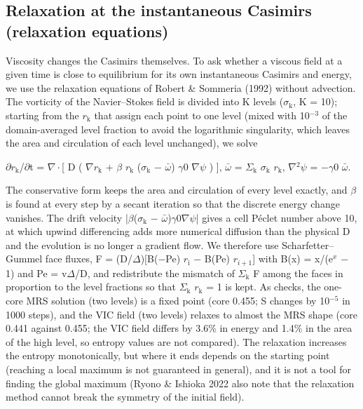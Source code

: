 \documentclass[11pt]{article}
\begin{document}
\subsection{Relaxation at the instantaneous Casimirs (relaxation equations)}
Viscosity changes the Casimirs themselves. To ask whether a viscous field at a given time is close to equilibrium for its own instantaneous Casimirs and energy, we use the relaxation equations of Robert \& Sommeria (1992) without advection. The vorticity of the Navier--Stokes field is divided into K levels ($\sigma{}_{\mathrm{k}}$, K = 10); starting from the $r_{\mathrm{k}}$ that assign each point to one level (mixed with 10$^{-3}$ of the domain-averaged level fraction to avoid the logarithmic singularity, which leaves the area and circulation of each level unchanged), we solve

  $\partial{}r_{\mathrm{k}}$/$\partial{}$t = $\nabla{}\cdot{}$[ D ( $\nabla{}r_{\mathrm{k}}$ + $\beta{}$ $r_{\mathrm{k}}$ ($\sigma{}_{\mathrm{k}}$ $-$ $\bar{\omega}$) $\gamma{}$0 $\nabla{}\psi{}$ ) ],  $\bar{\omega}$ = $\Sigma{}_{\mathrm{k}}$ $\sigma{}_{\mathrm{k}}$ $r_{\mathrm{k}}$,  $\nabla{}^{2}\psi{}$ = $-\gamma{}$0 $\bar{\omega}$.

The conservative form keeps the area and circulation of every level exactly, and $\beta{}$ is found at every step by a secant iteration so that the discrete energy change vanishes. The drift velocity |$\beta{}$($\sigma{}_{\mathrm{k}}$ $-$ $\bar{\omega}$)$\gamma{}$0$\nabla{}\psi{}$| gives a cell P\'eclet number above 10, at which upwind differencing adds more numerical diffusion than the physical D and the evolution is no longer a gradient flow. We therefore use Scharfetter--Gummel face fluxes, F = (D/$\Delta{}$)[B($-$Pe) $r_{\mathrm{i}}$ $-$ B(Pe) $r_{i+1}$] with B(x) = x/(e$^{x}$ $-$ 1) and Pe = v$\Delta{}$/D, and redistribute the mismatch of $\Sigma{}_{\mathrm{k}}$ F among the faces in proportion to the level fractions so that $\Sigma{}_{\mathrm{k}}$ $r_{\mathrm{k}}$ = 1 is kept. As checks, the one-core MRS solution (two levels) is a fixed point (core 0.455; S changes by 10$^{-5}$ in 1000 steps), and the VIC field (two levels) relaxes to almost the MRS shape (core 0.441 against 0.455; the VIC field differs by 3.6\% in energy and 1.4\% in the area of the high level, so entropy values are not compared). The relaxation increases the entropy monotonically, but where it ends depends on the starting point (reaching a local maximum is not guaranteed in general), and it is not a tool for finding the global maximum (Ryono \& Ishioka 2022 also note that the relaxation method cannot break the symmetry of the initial field).
\end{document}
